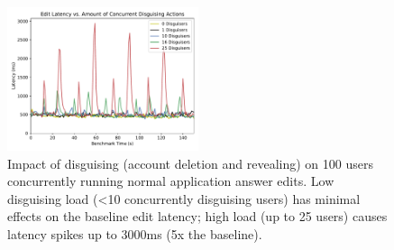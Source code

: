 \begin{figure}[t!]
    \centering
        \includegraphics[width=0.5\textwidth]{figs/concurrent_results_20lec_100users}
    \caption{Impact of disguising (account deletion and revealing) on 100 users concurrently running
    normal application answer edits. Low disguising load (<10 concurrently disguising users) has
    minimal effects on the baseline edit latency; high load (up to 25 users) causes latency spikes
    up to 3000ms (5x the baseline).} 
    \label{fig:concurrent}
\end{figure}
